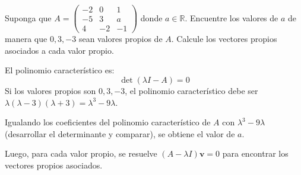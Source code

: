 	
\begin{prob}
Suponga que $A=\left( \begin{array}{ccc} -2&0&1 \\ -5&3&a\\ 4&-2&-1 \end{array} \right)$ donde $a\in \mathbb{R}.$ Encuentre los valores de $a$ de manera que $0, 3, -3$ sean valores propios de $A.$ Calcule los vectores propios asociados a cada valor propio.
\begin{myproof}
El polinomio característico es:
\[
\det(\lambda I - A) = 0
\]
Si los valores propios son $0, 3, -3$, el polinomio característico debe ser $\lambda(\lambda-3)(\lambda+3) = \lambda^3 - 9\lambda$.

Igualando los coeficientes del polinomio característico de $A$ con $\lambda^3 - 9\lambda$ (desarrollar el determinante y comparar), se obtiene el valor de $a$.

Luego, para cada valor propio, se resuelve $(A-\lambda I)\mathbf{v}=0$ para encontrar los vectores propios asociados.
\end{myproof}
\end{prob}


